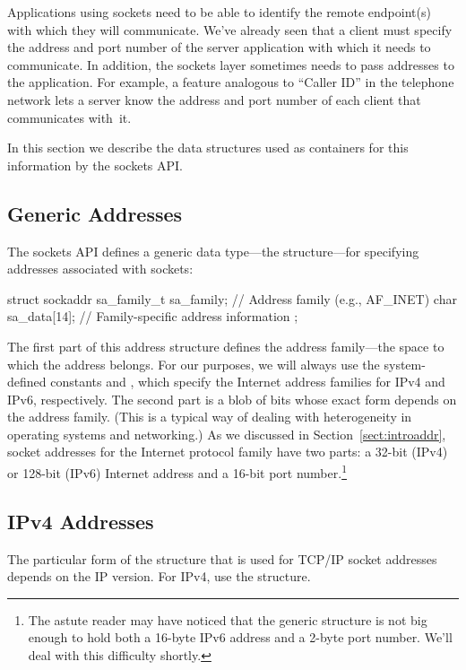 \noindent Applications using sockets need to be able to identify the
remote endpoint(s) with which they will communicate.
We've already seen that a client must
specify the address and port number
of the server application with which it needs to
communicate.  In addition, the sockets layer sometimes needs to pass
addresses to the application.  For example, a feature analogous to
``Caller ID'' in the telephone network lets a server know the
address and port number of each client that communicates with~it.

In this section we describe the data structures used as containers for
this information by the sockets API.

\subsection{Generic Addresses}

The sockets API defines a generic data type---the 
structure---for specifying addresses associated with sockets:

\begin{inlinecode}
struct sockaddr {
    sa_family_t sa_family;     // Address family (e.g., AF_INET)
    char sa_data[14];          // Family-specific address information
};
\end{inlinecode}

\noindent The first part of this address structure defines the address
family---the space to which the address belongs.  For our purposes, we
will always use the system-defined
constants  and ,
which specify the Internet address families for IPv4 and IPv6,
respectively.
%
The second part is a blob of bits whose exact form
depends on the address family.  (This is a typical way of
dealing with heterogeneity in operating systems and networking.)  As we
discussed in Section~\ref{sect:introaddr}, socket addresses for the
Internet protocol family have two
parts: a 32-bit (IPv4) or 128-bit (IPv6) Internet address and a 16-bit port
number.\footnote{The astute reader may have noticed that the generic
 structure is not big enough to hold both a 16-byte IPv6
address and a 2-byte port number.  We'll deal with this 
difficulty shortly.}

\subsection{IPv4 Addresses}

The particular form of the  structure that is used
for TCP/IP socket addresses depends on the IP version.  For IPv4, use the
 structure.

